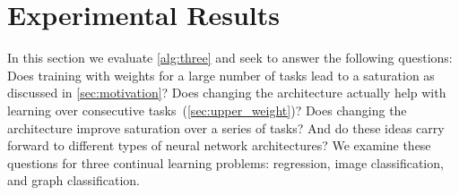
\section{Experimental Results}\label{sec: experiments}
In this section we evaluate  \cref{alg:three} and seek to answer the following questions: Does training with weights for a large number of tasks lead to a saturation as discussed in \cref{sec:motivation}? Does changing the architecture actually help with learning over consecutive tasks~(\cref{sec:upper_weight})? Does changing the architecture improve saturation over a series of tasks? And do these ideas carry forward to different types of neural network architectures? We examine these questions for three continual learning problems: regression, image classification, and graph classification.


